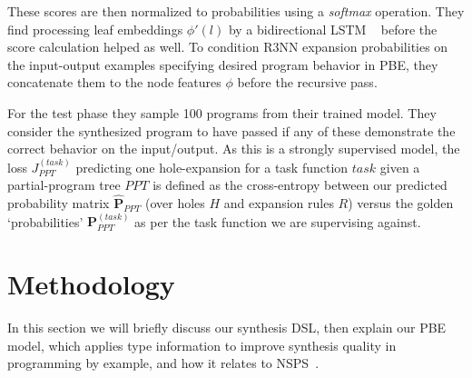 \documentclass{article} %
\begin{document}
These scores are then normalized to probabilities using a \emph{softmax} operation.
They find processing leaf embeddings $\phi'(l)$ by a bidirectional LSTM%
~\citep{huang2015bidirectional} before the score calculation helped as well.
To condition R3NN expansion probabilities on the input-output examples specifying desired program behavior in PBE,
they concatenate them to the node features $\phi$ before the recursive pass.

For the test phase they sample 100 programs from their trained model.
They consider the synthesized program to have passed if any of these demonstrate the correct behavior on the input/output.
%
As this is a strongly supervised model,
the loss $J^{(task)}_{PPT}$ predicting one hole-expansion for a task function $task$ given a
partial-program tree $PPT$ is defined as the cross-entropy between our predicted probability matrix
$\mathbf{\hat{P}}_{PPT}$ (over holes $H$ and expansion rules $R$)
versus the golden `probabilities' $\mathbf{P}^{(task)}_{PPT}$ as per the task function we are supervising against.


\vspace{-10pt}
\section{Methodology} %
\vspace{-10pt}

In this section we will briefly discuss our synthesis DSL, then explain our PBE model,
which applies type information to improve synthesis quality in programming by example,
and how it relates to NSPS~\citet{nsps}.
%
\end{document}
